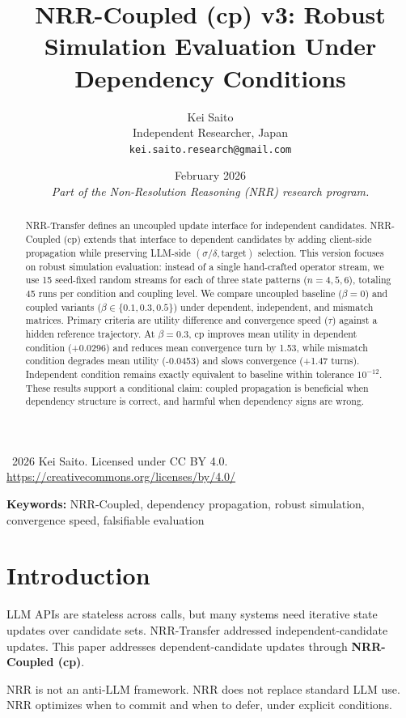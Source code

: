 \documentclass[11pt,a4paper]{article}
\title{\textbf{NRR-Coupled (cp) v3: Robust Simulation Evaluation Under Dependency Conditions}}
\author{Kei Saito\\Independent Researcher, Japan\\\texttt{kei.saito.research@gmail.com}}
\date{February 2026\\[0.5em]\textit{Part of the Non-Resolution Reasoning (NRR) research program.}}
\begin{document}
\maketitle

\begin{center}
\textcopyright\ 2026 Kei Saito. Licensed under CC BY 4.0.\\
\url{https://creativecommons.org/licenses/by/4.0/}
\end{center}

\begin{abstract}
NRR-Transfer defines an uncoupled update interface for independent candidates. NRR-Coupled (cp) extends that interface to dependent candidates by adding client-side propagation while preserving LLM-side \((\sigma/\delta,\text{target})\) selection. This version focuses on robust simulation evaluation: instead of a single hand-crafted operator stream, we use 15 seed-fixed random streams for each of three state patterns (\(n=4,5,6\)), totaling 45 runs per condition and coupling level. We compare uncoupled baseline (\(\beta=0\)) and coupled variants (\(\beta\in\{0.1,0.3,0.5\}\)) under dependent, independent, and mismatch matrices. Primary criteria are utility difference and convergence speed (\(\tau\)) against a hidden reference trajectory. At \(\beta=0.3\), cp improves mean utility in dependent condition (+0.0296) and reduces mean convergence turn by 1.53, while mismatch condition degrades mean utility (-0.0453) and slows convergence (+1.47 turns). Independent condition remains exactly equivalent to baseline within tolerance \(10^{-12}\). These results support a conditional claim: coupled propagation is beneficial when dependency structure is correct, and harmful when dependency signs are wrong.
\end{abstract}

\noindent\textbf{Keywords:} NRR-Coupled, dependency propagation, robust simulation, convergence speed, falsifiable evaluation

\section{Introduction}
LLM APIs are stateless across calls, but many systems need iterative state updates over candidate sets. NRR-Transfer addressed independent-candidate updates. This paper addresses dependent-candidate updates through \textbf{NRR-Coupled (cp)}.

NRR is not an anti-LLM framework.
NRR does not replace standard LLM use.
NRR optimizes when to commit and when to defer, under explicit conditions.
\end{document}

